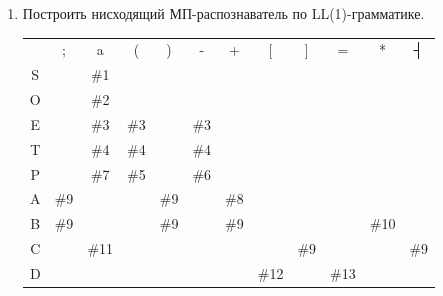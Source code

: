 \documentclass[a4paper,14pt]{extarticle}
\newcommand\mcc[1]{\multicolumn{1}{c}{#1}} %
\begin{document}
\begin{enumerate}[1.]
\begin{verbatim}
    7. P -> a
    11. B -> ε
    8. A -> +TA
    4. T -> PB
    6. P -> -(E)
    3. E -> TA
    4. T -> PB
    7. P -> a
    11. B -> ε
    9. A -> ε
    11. B -> ε
    9. A -> ε
    13. C -> ε
Цепочка невалидна
Трейсбек применяемых правил для a=[];:
    1. S -> O;C
    2. O -> aD
    15. D -> =E
Цепочка невалидна
Трейсбек применяемых правил для a=[a=a;][a=a;][a=a;][a=a;];:
    1. S -> O;C
    2. O -> aD
    15. D -> =E
Цепочка невалидна
\end{verbatim}

    \item Построить нисходящий МП-распознаватель по LL(1)-грамматике.\\
    \begin{tabular}{c|c|c|c|c|c|c|c|c|c|c|c|}
        \mcc{}                   & \mcc{;} & \mcc{a} & \mcc{(} & \mcc{)} & \mcc{-} & \mcc{+} & \mcc{[} & \mcc{]} & \mcc{=} & \mcc{*} & \mcc{┤} \\
        \cline{2-12} S           &         & \#1     &         &         &         &         &         &         &         &         &         \\
        \cline{2-12} O           &         & \#2     &         &         &         &         &         &         &         &         &         \\
        \cline{2-12} E           &         & \#3     & \#3     &         & \#3     &         &         &         &         &         &         \\
        \cline{2-12} T           &         & \#4     & \#4     &         & \#4     &         &         &         &         &         &         \\
        \cline{2-12} P           &         & \#7     & \#5     &         & \#6     &         &         &         &         &         &         \\
        \cline{2-12} A           & \#9     &         &         & \#9     &         & \#8     &         &         &         &         &         \\
        \cline{2-12} B           & \#9     &         &         & \#9     &         & \#9     &         &         &         & \#10    &         \\
        \cline{2-12} C           &         & \#11    &         &         &         &         &         & \#9     &         &         & \#9     \\
        \cline{2-12} D           &         &         &         &         &         &         & \#12    &         & \#13    &         &         \\

\end{tabular}
\end{enumerate}
\end{document}

